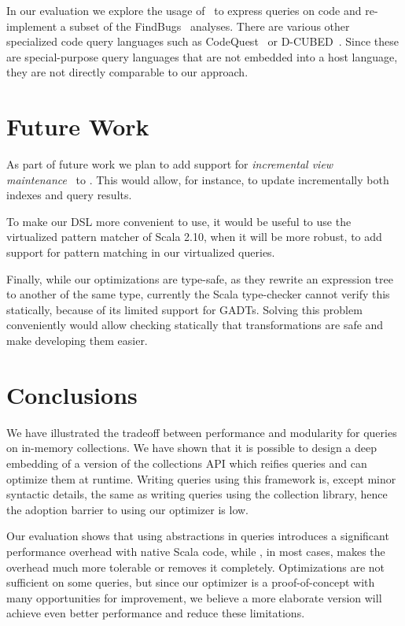 In our evaluation we explore the usage of \LoS\ to express queries on code and re-implement a subset of the FindBugs~\citep{DBLP:journals/sigplan/HovemeyerP04} analyses. There are various other specialized code query languages such as 
CodeQuest~\citep{Hajiyev06CodeQuest} or D-CUBED~\citep{Wegrzynowicz:2009:GBU:1639950.1640032}. 
Since these are special-purpose query languages that are not embedded into a host language, they are not directly comparable to our approach.



\section{Future Work}
As part of future work we plan to add support for \emph{incremental view
maintenance}~\citep{GlucheGrust97Incr} to \LoS. This would allow, for instance,
to update incrementally both indexes and query results.

To make our DSL more convenient to use, it would be useful to use the
virtualized pattern matcher of Scala 2.10, when it will be more robust, to add
support for pattern matching in our virtualized queries.

Finally, while our optimizations are type-safe, as they rewrite an expression
tree to another of the same type, currently the Scala
type-checker cannot verify this statically, because of its limited support for
GADTs.
Solving this problem conveniently would allow checking statically that
transformations are safe and make developing them easier.

\section{Conclusions}
\label{sec:concl}

We have illustrated the tradeoff between performance and modularity for queries on in-memory collections. We have shown that it is possible to design a deep embedding of a version of the collections API which reifies queries and can optimize them at runtime.
Writing queries using this framework is, except minor syntactic details, the same as writing queries using the collection library, hence the adoption barrier to using our optimizer is low. 

Our evaluation shows that using abstractions in queries introduces a significant
performance overhead with native Scala code, while \LoS{}, in most cases, makes
the overhead much more tolerable or removes it completely. Optimizations are not
sufficient on some queries, but since our optimizer is a proof-of-concept with
many opportunities for improvement, we believe a more elaborate version will
achieve even better performance and reduce these limitations.


